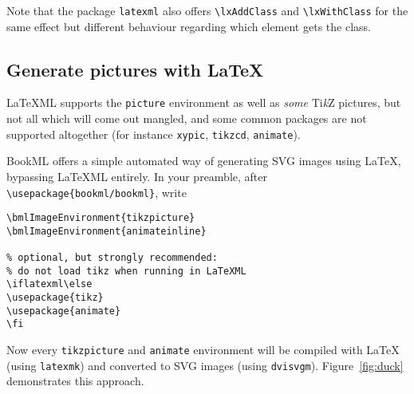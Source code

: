 \documentclass[a4paper,british]{article}
\def\tikzname{Ti\emph{k}Z}
\def\ltxinline{\lstinline[style=bookml]}
\begin{document}
Note that the package \ltxinline|latexml| also offers \ltxinline|\lxAddClass| and \ltxinline|\lxWithClass| for the same effect but different behaviour regarding which element gets the class.

\subsection{Generate pictures with \LaTeX{}}
\label{sec:external-image}

LaTeXML supports the \ltxinline|picture| environment as well as \emph{some} \tikzname{} pictures, but not all which will come out mangled, and some common packages are not supported altogether (for instance \ltxinline|xypic|, \ltxinline|tikzcd|, \ltxinline|animate|).

BookML offers a simple automated way of generating SVG images using \LaTeX{}, bypassing LaTeXML entirely. In your preamble, after \ltxinline|\usepackage{bookml/bookml}|, write
\begin{lstlisting}[style=bookml]
\bmlImageEnvironment{tikzpicture}
\bmlImageEnvironment{animateinline}

% optional, but strongly recommended:
% do not load tikz when running in LaTeXML
\iflatexml\else
\usepackage{tikz}
\usepackage{animate}
\fi
\end{lstlisting}

Now every \ltxinline|tikzpicture| and \ltxinline|animate| environment will be compiled with \LaTeX{} (using \lstinline[frame=none]|latexmk|) and converted to SVG images (using \lstinline[frame=none]|dvisvgm|). Figure~\ref{fig:duck} demonstrates this approach.
\end{document}
